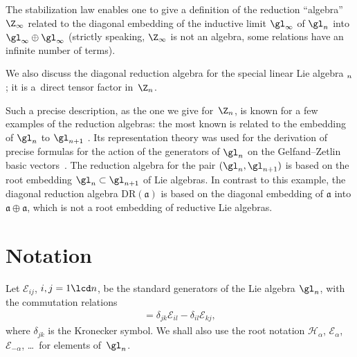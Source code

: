 \documentclass[pdftex]{sigma}
\numberwithin{equation}{section}
\begin{document}
The stabilization law enables one to give a def\/inition of the reduction ``algebra'' $\Z_\infty$ related to the diagonal embedding of the inductive
limit $\gl_\infty$ of $\gl_n$ into $\gl_\infty\oplus \gl_\infty$ (strictly speaking, $\Z_\infty$ is not an algebra, some relations have an inf\/inite number of terms).


We also discuss the diagonal reduction algebra for the special linear Lie algebra $\sl_n$; it is a~direct tensor factor in~$\Z_{n}$.


Such a precise description, as the one we give for~$\Z_{n}$, is known for a few examples of the reduction algebras: the most known is related to the
embedding of $\gl_n$ to $\gl_{n+1}$ \cite{Zh}. Its representation theory was used for the derivation of precise formulas for the action of the generators
of $\gl_n$ on the Gelfand--Zetlin basic vectors~\cite{AST2}. The reduction algebra for the pair $(\gl_n,\gl_{n+1})$ is based on the root embedding
$\gl_n\subset\gl_{n+1}$ of Lie algebras. In contrast to this example, the  diagonal reduction algebra ${\mathrm{DR}}({\mathfrak a})$ is
based on the diagonal embedding of ${\mathfrak a}$ into
${\mathfrak a}\oplus {\mathfrak a}$, which is not a root embedding of reductive Lie algebras.

\section{Notation}\label{section-notation}

Let ${\mathcal{E}}_{ij}$, $i,j=1\lcd n$, be the standard generators of the Lie algebra $\gl_n$, with the commutation relations
\begin{gather*}
[{\mathcal{E}}_{ij},{\mathcal{E}}_{kl}]=\delta_{jk}{\mathcal{E}}_{il}-\delta_{il}{\mathcal{E}}_{kj} ,
\end{gather*}
where $\delta_{jk}$ is the Kronecker symbol. We shall also use the root notation ${\mathcal{H}}_\alpha$, ${\mathcal{E}}_{\alpha}$, ${\mathcal{E}}_{-\alpha}$, \dots\ for elements of~$\gl_n$.
\end{document}
